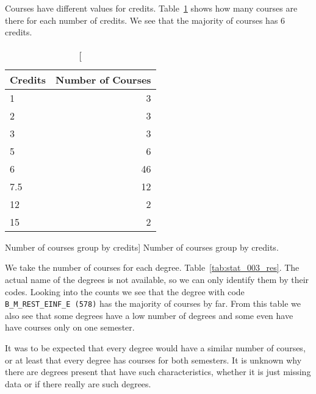 Courses have different values for credits. Table~\ref{tab:courses_credits}
shows how many courses are there for each number of credits. We see that the
majority of courses has 6 credits.

\begin{table}[h!]
    \centering

    \begin{tabular}{| l | r |}
        \hline
        Credits & Number of Courses \\ \hline
        1       & 3                 \\ \hline
        2       & 3                 \\ \hline
        3       & 3                 \\ \hline
        5       & 6                 \\ \hline
        6       & 46                \\ \hline
        7.5     & 12                \\ \hline
        12      & 2                 \\ \hline
        15      & 2                 \\ \hline
    \end{tabular}

    \caption
        [Number of courses group by credits]
        {Number of courses group by credits.}

    \label{tab:courses_credits}
\end{table}

We take the number of courses for each degree. Table~\ref{tab:stat_003_res}.
The actual name of the degrees is not available, so we can only identify them
by their codes. Looking into the counts we see that the degree with code
\texttt{B\_M\_REST\_EINF\_E (578)} has the majority of courses by far. From
this table we also see that some degrees have a low number of degrees and some
even have have courses only on one semester.

It was to be expected that every degree would have a similar number of courses,
or at least that every degree has courses for both semesters. It is unknown why
there are degrees present that have such characteristics, whether it is just
missing data or if there really are such degrees.

